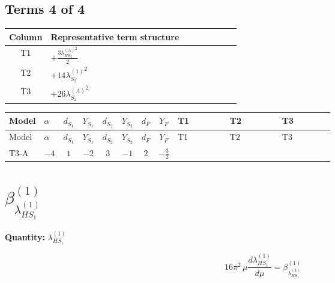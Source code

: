 \documentclass[8pt]{article}
\begin{document}
\begin{landscape}
\subsection*{Terms 4 of 4}
\begin{center}
\begin{tabular}{@{}c >{\raggedright\arraybackslash}p{0.82\linewidth}@{}}
\toprule
Column & Representative term structure \\
\midrule
T1 & \(\displaystyle +\frac{3 {\lambda_{HS_2}^{(A)}}^2}{2}\) \\
\midrule
T2 & \(\displaystyle +14 {\lambda_{S_2}^{(1)}}^2\) \\
\midrule
T3 & \(\displaystyle +26 {\lambda_{S_2}^{(A)}}^2\) \\
\midrule
\bottomrule
\end{tabular}
\end{center}
\smallskip
\tiny
\begin{longtable}{@{}llcccccc >{\raggedright\arraybackslash}p{0.21\linewidth} >{\raggedright\arraybackslash}p{0.21\linewidth} >{\raggedright\arraybackslash}p{0.21\linewidth}@{}}
\toprule
Model & $\alpha$ & $d_{S_1}$ & $Y_{S_1}$ & $d_{S_2}$ & $Y_{S_2}$ & $d_F$ & $Y_F$ & T1 & T2 & T3 \\
\midrule
\endfirsthead
\toprule
Model & $\alpha$ & $d_{S_1}$ & $Y_{S_1}$ & $d_{S_2}$ & $Y_{S_2}$ & $d_F$ & $Y_F$ & T1 & T2 & T3 \\
\midrule
\endhead
T3-A & $-4$ & $1$ & $-2$ & $3$ & $-1$ & $2$ & $-\frac{3}{2}$ & \scriptsize\adjustbox{max width=\linewidth}{$\begin{gathered} +\frac{3 {\lambda_{HS_2}^{(A)}}^2}{2}\end{gathered}$} & \scriptsize\adjustbox{max width=\linewidth}{$\begin{gathered} +14 {\lambda_{S_2}^{(1)}}^2\end{gathered}$} & \scriptsize\adjustbox{max width=\linewidth}{$\begin{gathered} +26 {\lambda_{S_2}^{(A)}}^2\end{gathered}$} \\
\midrule
\bottomrule
\end{longtable}
\clearpage
\section*{$\beta_{\lambda_{HS_1}^{(1)}}^{(1)}$}
\noindent\textbf{Quantity: }$\lambda_{HS_1}^{(1)}$\par\smallskip
\[16\pi^2\,\mu\frac{d \lambda_{HS_1}^{(1)}}{d\mu}=\beta_{\lambda_{HS_1}^{(1)}}^{(1)}\]

\end{landscape}
\end{document}
